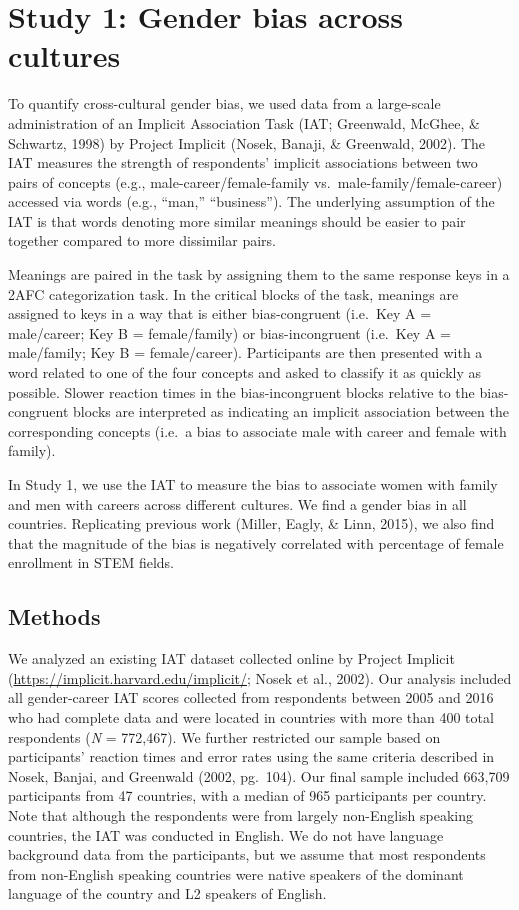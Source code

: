 \documentclass[man]{apa6}
\theoremstyle{definition}
\theoremstyle{definition}
\theoremstyle{definition}
\theoremstyle{remark}
\begin{document}
\section{Study 1: Gender bias across
cultures}\label{study-1-gender-bias-across-cultures}

To quantify cross-cultural gender bias, we used data from a large-scale
administration of an Implicit Association Task (IAT; Greenwald, McGhee,
\& Schwartz, 1998) by Project Implicit (Nosek, Banaji, \& Greenwald,
2002). The IAT measures the strength of respondents' implicit
associations between two pairs of concepts (e.g.,
male-career/female-family vs.~male-family/female-career) accessed via
words (e.g., \enquote{man,} \enquote{business}). The underlying
assumption of the IAT is that words denoting more similar meanings
should be easier to pair together compared to more dissimilar pairs.

Meanings are paired in the task by assigning them to the same response
keys in a 2AFC categorization task. In the critical blocks of the task,
meanings are assigned to keys in a way that is either bias-congruent
(i.e.~Key A = male/career; Key B = female/family) or bias-incongruent
(i.e.~Key A = male/family; Key B = female/career). Participants are then
presented with a word related to one of the four concepts and asked to
classify it as quickly as possible. Slower reaction times in the
bias-incongruent blocks relative to the bias-congruent blocks are
interpreted as indicating an implicit association between the
corresponding concepts (i.e.~a bias to associate male with career and
female with family).

In Study 1, we use the IAT to measure the bias to associate women with
family and men with careers across different cultures. We find a gender
bias in all countries. Replicating previous work (Miller, Eagly, \&
Linn, 2015), we also find that the magnitude of the bias is negatively
correlated with percentage of female enrollment in STEM fields.

\subsection{Methods}\label{methods}

We analyzed an existing IAT dataset collected online by Project Implicit
(\url{https://implicit.harvard.edu/implicit/}; Nosek et al., 2002). Our
analysis included all gender-career IAT scores collected from
respondents between 2005 and 2016 who had complete data and were located
in countries with more than 400 total respondents (\emph{N} = 772,467).
We further restricted our sample based on participants' reaction times
and error rates using the same criteria described in Nosek, Banjai, and
Greenwald (2002, pg.~104). Our final sample included 663,709
participants from 47 countries, with a median of 965 participants per
country. Note that although the respondents were from largely
non-English speaking countries, the IAT was conducted in English. We do
not have language background data from the participants, but we assume
that most respondents from non-English speaking countries were native
speakers of the dominant language of the country and L2 speakers of
English.
\end{document}
